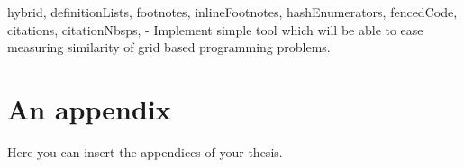 \documentclass[
  digital, %
  table,   %
  nolof,     %
  nolot,     %
  nocover
]{fithesis3}
\begin{document}
\begin{markdown*}{%
  hybrid,
  definitionLists,
  footnotes,
  inlineFootnotes,
  hashEnumerators,
  fencedCode,
  citations,
  citationNbsps,
}
- Implement simple tool which will be able to ease measuring similarity of grid based programming problems.

%
%

\iffalse %

# Robotanik

In this chapter we will talk more about things that are specific to Robotanik and data used in our analysis.

Most of the experiments were executed on data collected from programming environment Robotanik available at [tutor.fi.muni.cz](http://tutor.fi.muni.cz/). Robotanik is programming environment with 78 handcrafted problems for student to solve. Goal of the student is to write program for robot to traverse board and collect all flowers. Each problem has board filled with tiles of stones, colored tiles (green, red, brown) and flowers.

## Data

**Problem statements**

**Solutions**

**Performance data**

## Chosen metrics

In this thesis we are consider only some metrics. We will describe them in detail in this chapter.

### Problem statement

### Solutions

### Performance data


%
%

# Tool

## Tool capabilities

## Chosen metrics

## Evaluation

### Compare metrics

### Collecting crowd-truth

## Visualisations

\fi %

\end{markdown*}

  \makeatletter\thesis@blocks@clear\makeatother
  \printindex

\appendix %
\chapter{An appendix}
Here you can insert the appendices of your thesis.
\end{document}
